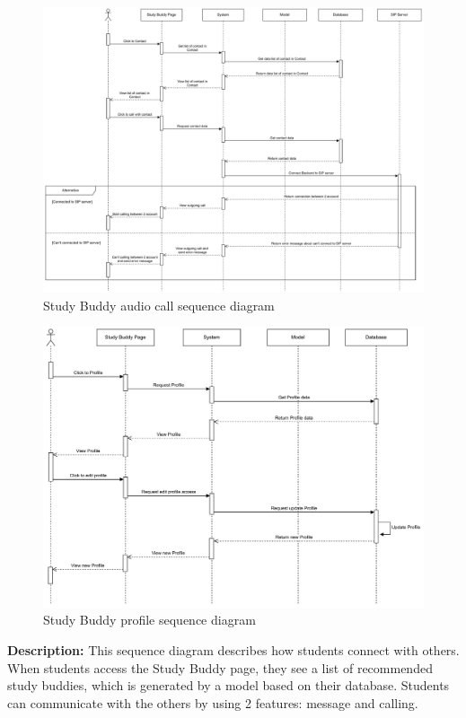     \begin{figure}[H]
        \centering
        \includegraphics[width=1\textwidth]{image/StudyBuddySequenceDiagram-Contact.pdf} 
        \caption{Study Buddy audio call sequence diagram}
        \label{fig:studyBuddy_audiocall_sequence}
    \end{figure}

    \begin{figure}[H]
        \centering
        \includegraphics[width=1\textwidth]{image/StudyBuddySequenceDiagram-Profile.pdf} 
        \caption{Study Buddy profile sequence diagram}
        \label{fig:studyBuddy_profile_sequence}
    \end{figure}

    \textbf{Description:} This sequence diagram describes how students connect with others. 
    When students access the Study Buddy page, they see a list of recommended study buddies, which is generated by a model based on their database. 
    Students can communicate with the others by using 2 features: message and calling.

